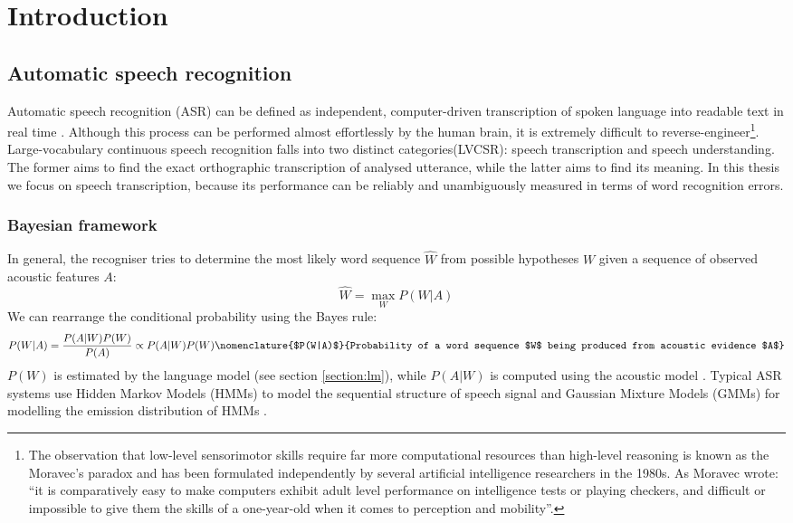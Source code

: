 \chapter{Introduction}
\label{chapter:intro}

\section{Automatic speech recognition}
\label{section:asr}
Automatic speech recognition (ASR)  can be defined as independent, computer-driven transcription of spoken language into readable text in real time \cite{stuckless1994developments, jelinek1997statistical}. Although this process can be performed almost effortlessly by the human brain, it is extremely difficult to reverse-engineer\footnote{The observation that low-level sensorimotor skills require far more computational resources than high-level reasoning is known as the Moravec's paradox and has been formulated independently by several artificial intelligence researchers in the 1980s. As Moravec wrote: ``it is comparatively easy to make computers exhibit adult level performance on intelligence tests or playing checkers, and difficult or impossible to give them the skills of a one-year-old when it comes to perception and mobility''\cite{moravec1988mind}.}. Large-vocabulary continuous speech recognition falls into two distinct categories(LVCSR): speech transcription and speech understanding. The former aims to find the exact orthographic transcription of analysed utterance, while the latter aims to find its meaning. In this thesis we focus on speech transcription, because its performance can be reliably and unambiguously measured in terms of word recognition errors.
\subsection{Bayesian framework}
In general, the recogniser tries to determine the most likely word sequence $\hat{W}$ from possible hypotheses $W$ given a sequence of observed acoustic features $A$:
\begin{equation}
\label{equation:recogniser}
  \hat{W}=\max_{W}P(W|A)
\end{equation}
We can rearrange the conditional probability using the Bayes rule:
\begin{equation}
  \label{equation:bayesian}
  P(W|A)=\frac{P(A|W)P(W)}{P(A)}\propto{P(A|W)P(W)}
  \nomenclature{$P(W|A)$}{Probability of a word sequence $W$ being produced from acoustic evidence $A$}
\end{equation}
$P(W)$ is estimated by the language model (see section \ref{section:lm}), while $P(A|W)$ is computed using the acoustic model \cite{whittaker2000statistical}. Typical ASR systems use Hidden Markov Models (HMMs)  to model the sequential structure of speech signal \cite{juang1985mixture, baker1975dragon} and Gaussian Mixture Models (GMMs)  for modelling the emission distribution of HMMs \cite{mohamed2012acoustic, bourlard1994connectionist}.

